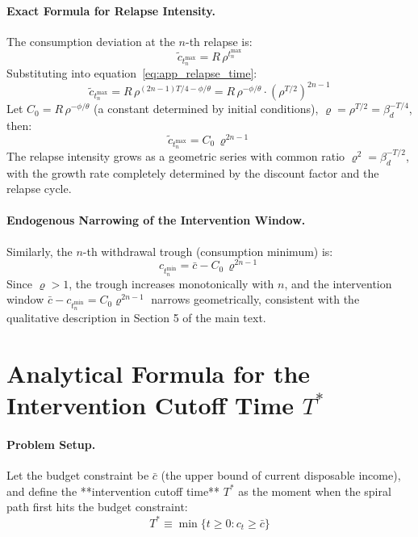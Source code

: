 \documentclass[12pt]{article}
\begin{document}
\paragraph{Exact Formula for Relapse Intensity.}
The consumption deviation at the $n$-th relapse is:
\begin{equation}\label{eq:app_relapse_intensity}
\tilde{c}_{t_n^{\max}} = R\,\rho^{t_n^{\max}}
\end{equation}
Substituting into equation~\eqref{eq:app_relapse_time}:
\begin{equation}
\tilde{c}_{t_n^{\max}}
= R\,\rho^{(2n-1)T/4 - \phi/\theta}
= R\,\rho^{-\phi/\theta} \cdot \left(\rho^{T/2}\right)^{2n-1}
\end{equation}
Let $C_0 = R\,\rho^{-\phi/\theta}$ (a constant determined by initial conditions),
$\varrho = \rho^{T/2} = \beta_d^{-T/4}$, then:
\begin{equation}\label{eq:app_intensity_formula}
\boxed{\tilde{c}_{t_n^{\max}} = C_0\,\varrho^{2n-1}}
\end{equation}
The relapse intensity grows as a geometric series with common ratio $\varrho^2 = \beta_d^{-T/2}$,
with the growth rate completely determined by the discount factor and the relapse cycle.

\paragraph{Endogenous Narrowing of the Intervention Window.}
Similarly, the $n$-th withdrawal trough (consumption minimum) is:
\begin{equation}\label{eq:app_trough}
c_{t_n^{\min}} = \bar{c} - C_0\,\varrho^{2n-1}
\end{equation}
Since $\varrho > 1$, the trough increases monotonically with $n$, and the intervention window
$\bar{c} - c_{t_n^{\min}} = C_0\varrho^{2n-1}$
narrows geometrically, consistent with the qualitative description in Section 5 of the main text.


\section{Analytical Formula for the Intervention Cutoff Time $T^*$}
\label{app:intervention_time}
\paragraph{Problem Setup.}
Let the budget constraint be $\bar{c}$ (the upper bound of current disposable income),
and define the **intervention cutoff time** $T^*$ as the moment when the spiral path first hits the budget constraint:
\begin{equation}
T^* \equiv \min\bigl\{t \geq 0 : c_t \geq \bar{c}\bigr\}
\end{equation}
\end{document}
